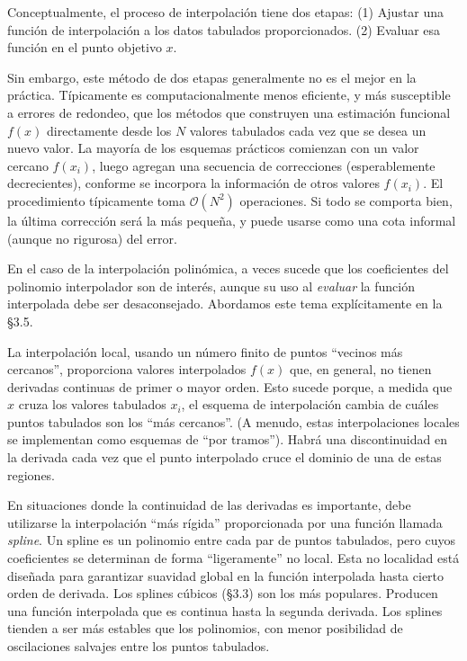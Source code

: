 \documentclass[10pt,a4paper]{book}
\begin{document}
Conceptualmente, el proceso de interpolación tiene dos etapas: (1) Ajustar una función de interpolación a los datos tabulados proporcionados. (2) Evaluar esa función en el punto objetivo \( x \).

\medskip

Sin embargo, este método de dos etapas generalmente no es el mejor en la práctica. Típicamente es computacionalmente menos eficiente, y más susceptible a errores de redondeo, que los métodos que construyen una estimación funcional \( f(x) \) directamente desde los \( N \) valores tabulados cada vez que se desea un nuevo valor. La mayoría de los esquemas prácticos comienzan con un valor cercano \( f(x_i) \), luego agregan una secuencia de correcciones (esperablemente decrecientes), conforme se incorpora la información de otros valores \( f(x_i) \). El procedimiento típicamente toma \( \mathcal{O}(N^2) \) operaciones. Si todo se comporta bien, la última corrección será la más pequeña, y puede usarse como una cota informal (aunque no rigurosa) del error.

\medskip

En el caso de la interpolación polinómica, a veces sucede que los coeficientes del polinomio interpolador son de interés, aunque su uso al \textit{evaluar} la función interpolada debe ser desaconsejado. Abordamos este tema explícitamente en la \S3.5.

\medskip

La interpolación local, usando un número finito de puntos “vecinos más cercanos”, proporciona valores interpolados \( f(x) \) que, en general, no tienen derivadas continuas de primer o mayor orden. Esto sucede porque, a medida que \( x \) cruza los valores tabulados \( x_i \), el esquema de interpolación cambia de cuáles puntos tabulados son los “más cercanos”. (A menudo, estas interpolaciones locales se implementan como esquemas de “por tramos”). Habrá una discontinuidad en la derivada cada vez que el punto interpolado cruce el dominio de una de estas regiones.

En situaciones donde la continuidad de las derivadas es importante, debe utilizarse la interpolación “más rígida” proporcionada por una función llamada \textit{spline}. Un spline es un polinomio entre cada par de puntos tabulados, pero cuyos coeficientes se determinan de forma “ligeramente” no local. Esta no localidad está diseñada para garantizar suavidad global en la función interpolada hasta cierto orden de derivada. Los splines cúbicos (\S3.3) son los más populares. Producen una función interpolada que es continua hasta la segunda derivada. Los splines tienden a ser más estables que los polinomios, con menor posibilidad de oscilaciones salvajes entre los puntos tabulados.
\end{document}
